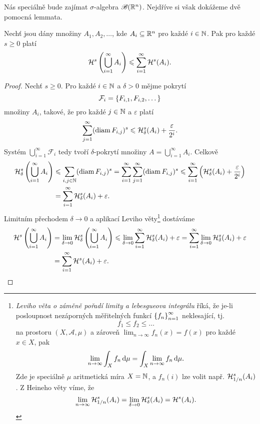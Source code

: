 Nás speciálně bude zajímat $\sigma$-algebra $\borelsigmaalgebra(\R^n)$. Nejdříve si však dokážeme dvě pomocná lemmata.
\begin{lemma}\label{lem:Hausdorffova-mira-subaditivita}
    Nechť jsou dány množiny $A_1,A_2,\ldots$, kde $A_i\subseteq\R^n$ pro každé $i\in\N$. Pak pro každé $s\geqslant 0$ platí
    \[\hausdorffmeasure{s}\left(\bigcup_{i=1}^\infty A_i\right)\leqslant\sum_{i=1}^{\infty}\hausdorffmeasure{s}(A_i).\]
\end{lemma}
\begin{proof}
    Nechť $s\geqslant 0$. Pro každé $i\in\N$ a $\delta>0$ mějme pokrytí
    \[\mathcal{F}_i=\set{F_{i,1},F_{i,2},\dots}\]
    množiny $A_i$, takové, že pro každé $j\in\N$ a $\varepsilon$ platí
    \[\sum_{j=1}^{\infty}(\diam{F_{i,j}})^s\leqslant\hausdorffdeltameasure{s}{\delta}(A_i)+\dfrac{\varepsilon}{2^i}.\]
    Systém $\bigcup_{i=1}^\infty\mathcal{F}_i$ tedy tvoří $\delta$-pokrytí množiny $A=\bigcup_{i=1}^\infty A_i$. Celkově
    \begin{align*}
        \hausdorffdeltameasure{s}{\delta}\left(\bigcup_{i=1}^\infty A_i\right)&\leqslant\sum_{i,j\in\N}(\diam{F_{i,j}})^s=\sum_{i=1}^{\infty}\sum_{j=1}^{\infty}(\diam{F_{i,j}})^s\leqslant\sum_{i=1}^{\infty}\left(\hausdorffdeltameasure{s}{\delta}(A_i)+\dfrac{\varepsilon}{2^i}\right)\\
        &=\sum_{i=1}^{\infty}\hausdorffdeltameasure{s}{\delta}(A_i)+\varepsilon.
    \end{align*}
    Limitním přechodem $\delta\to 0$ a aplikací Leviho věty\footnote{\emph{Leviho věta o záměně pořadí limity a lebesgueova integrálu} říká, že je-li posloupnost nezáporných měřitelných funkcí $\set{f_n}_{n=1}^\infty$ neklesající, tj.
    \[f_1\leqslant f_2\leqslant\dots\]
    na prostoru $(X,\mathcal{A},\mu)$ a zároveň $\lim_{n\to\infty}f_n(x)=f(x)$ pro každé $x\in X$, pak
    \[\lim_{n\to\infty}\int_X f_n\dx[\mu]=\int_X \lim_{n\to\infty}f_n\dx[\mu].\]
    Zde je speciálně $\mu$ aritmetická míra $X=\N$, a $f_n(i)$ lze volit např. $\hausdorffdeltameasure{s}{1/n}(A_i)$. Z Heineho věty víme, že
    \[\lim_{n\to\infty}\hausdorffdeltameasure{s}{1/n}(A_i)=\lim_{\delta\to 0}\hausdorffdeltameasure{s}{\delta}(A_i)=\hausdorffmeasure{s}(A_i).\]
    }
    dostáváme
    \begin{align*}
        \hausdorffmeasure{s}\left(\bigcup_{i=1}^\infty A_i\right)&=\lim_{\delta\to 0}\hausdorffdeltameasure{s}{\delta}\left(\bigcup_{i=1}^\infty A_i\right)\leqslant\lim_{\delta\to 0}\sum_{i=1}^{\infty}\hausdorffdeltameasure{s}{\delta}(A_i)+\varepsilon=\sum_{i=1}^{\infty}\lim_{\delta\to 0}\hausdorffdeltameasure{s}{\delta}(A_i)+\varepsilon\\
        &=\sum_{i=1}^{\infty}\hausdorffmeasure{s}(A_i)+\varepsilon.
    \end{align*} 
\end{proof}
